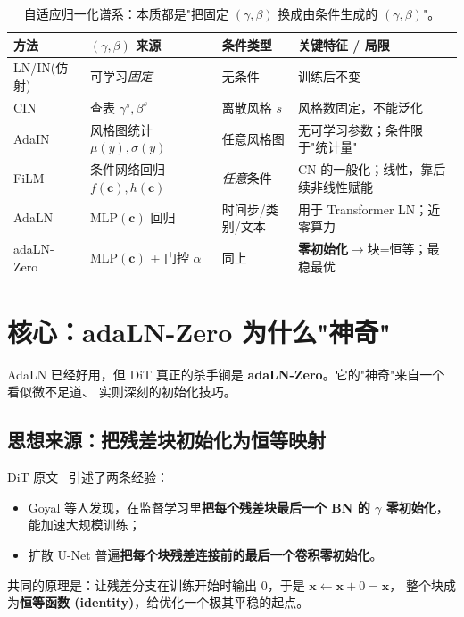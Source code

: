 \documentclass[11pt]{ctexart}
\newcommand{\cc}{\mathbf{c}}
\newcommand{\xx}{\mathbf{x}}
\theoremstyle{definition}
\begin{document}
\begin{table}[t]
\centering\small
\renewcommand{\arraystretch}{1.35}
\begin{tabularx}{\textwidth}{@{}l l l X@{}}
\toprule
\textbf{方法} & \textbf{$(\gamma,\beta)$ 来源} & \textbf{条件类型} & \textbf{关键特征 / 局限} \\
\midrule
LN/IN(仿射) & 可学习\emph{固定} & 无条件 & 训练后不变 \\
CIN        & 查表 $\gamma^s,\beta^s$ & 离散风格 $s$ & 风格数固定，不能泛化 \\
AdaIN      & 风格图统计 $\mu(y),\sigma(y)$ & 任意风格图 & 无可学习参数；条件限于"统计量" \\
FiLM       & 条件网络回归 $f(\cc),h(\cc)$ & \emph{任意}条件 & CN 的一般化；线性，靠后续非线性赋能 \\
AdaLN      & MLP$(\cc)$ 回归 & 时间步/类别/文本 & 用于 Transformer LN；近零算力 \\
adaLN-Zero & MLP$(\cc)$ + 门控 $\alpha$ & 同上 & \textbf{零初始化}$\to$块=恒等；最稳最优 \\
\bottomrule
\end{tabularx}
\caption{自适应归一化谱系：本质都是"把固定 $(\gamma,\beta)$ 换成由条件生成的 $(\gamma,\beta)$"。}
\end{table}

\section{核心：adaLN-Zero 为什么"神奇"}

AdaLN 已经好用，但 DiT 真正的杀手锏是 \textbf{adaLN-Zero}。它的"神奇"来自一个看似微不足道、
实则深刻的初始化技巧。

\subsection{思想来源：把残差块初始化为恒等映射}
DiT 原文~\cite{dit} 引述了两条经验：
\begin{itemize}
  \item Goyal 等人发现，在监督学习里\textbf{把每个残差块最后一个 BN 的 $\gamma$ 零初始化}，
        能加速大规模训练；
  \item 扩散 U-Net 普遍\textbf{把每个块残差连接前的最后一个卷积零初始化}。
\end{itemize}
共同的原理是：让残差分支在训练开始时输出 $0$，于是 $\xx \leftarrow \xx + 0 = \xx$，
整个块成为\textbf{恒等函数 (identity)}，给优化一个极其平稳的起点。
\end{document}
